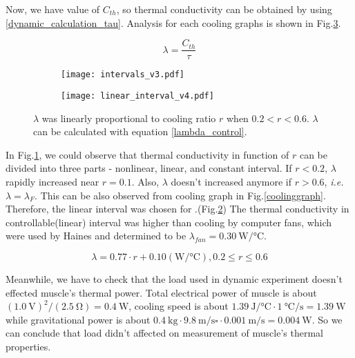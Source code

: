 Now, we have value of $C_{th}$, so thermal conductivity can be obtained by using \eqref{dynamic_calculation_tau}. Analysis for each cooling graphs is shown in Fig.\ref{analysis_dynamic}.

\begin{equation} \label{dynamic_calculation_tau}
\lambda = \frac{C_{th}}{\tau}
\end{equation}

\begin{figure}[t]
	\begin{subfigure}[t]{0.52\linewidth}
		\centering\texttt{[image: intervals\_v3.pdf]}
		\caption{\label{dynamic_proportional}}
	\end{subfigure}%
	\begin{subfigure}[t]{0.39\linewidth}
		\centering\texttt{[image: linear\_interval\_v4.pdf]}
		\caption{\label{linear_interval}}
	\end{subfigure}
	\caption[Analysis of dynamic experiment]{ $\lambda$ was linearly proportional to cooling ratio $r$ when $0.2<r<0.6$.   $\lambda$ can be calculated with equation \eqref{lambda_control}.}
	\label{analysis_dynamic}
\end{figure}

In Fig.\ref{dynamic_proportional}, we could observe that thermal conductivity in function of $r$ can be divided into three parts - nonlinear, linear, and constant interval. If $r<0.2$, $\lambda$ rapidly increased near $r=0.1$. Also, $\lambda$ doesn't increased anymore if $r>0.6$, {\it i.e.} $\lambda = \lambda_{F}$. This can be also observed from cooling graph in Fig.\ref{coolinggraph}.
Therefore, the linear interval was chosen for \Apcnospace.(Fig.\ref{linear_interval}) The thermal conductivity in controllable(linear) interval was higher than cooling by computer fans, which were used by Haines \etalspace and determined to be $\lambda_{fan}=\SI{0.30}{\watt\per\degreeCelsius}$.

\begin{equation} \label{lambda_control}
\lambda = 0.77\cdot r + 0.10 (\si{\watt\per\degreeCelsius}), 0.2\leq r \leq 0.6
\end{equation}


Meanwhile, we have to check that the load used in dynamic experiment doesn't effected muscle's thermal power. %
Total electrical power of muscle is about $(\SI{1.0}{\volt})^2/(\SI{2.5}{\ohm})=\SI{0.4}{\watt}$, cooling speed is about $\SI{1.39}{\joule\per\degreeCelsius} \cdot \SI{1}{\degreeCelsius\per\second}=\SI{1.39}{\watt}$ while gravitational power is about  $\SI{0.4}{\kilo\gram} \cdot  \SI{9.8}{\meter\per\second\square} \cdot \SI{0.001}{\meter\per\second}=\SI{0.004}{\watt}$. So we can conclude that load didn't affected on measurement of muscle's thermal properties.



